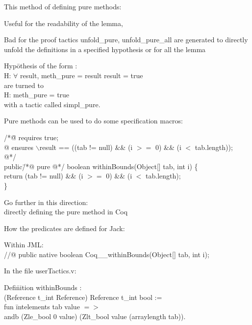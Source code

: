 \small
This method of defining pure methods:
\blist
\item Useful for the {\purple readability} of the lemma,
\item Bad for the proof
\elist
\rarrow tactics {\purple unfold\_pure}, {\purple unfold\_pure\_all}  are generated to {\purple directly 
unfold} the definitions in a specified hypothesis or for all the lemma
\begin{tabbing}
Hyp\=othesis of the form :\\
\>H: $\forall$ result, meth\_pure = result \rarrow result = true\\
are turned to\\
\>H: meth\_pure = true\\
with a tactic called {\purple simpl\_pure}.
\end{tabbing}
\small
\blist
\item Pure methods can be used to do some specification macros:
\begin{tabbing}
 /*\=@ {\purple requires} true;\+\\
   @ {\purple ensures} $\backslash$result == ((tab != null) \&\& (i $>=$ 0) \&\& (i $<$ tab.length));\\
   @*/\-\\
 public\= /*@ {\purple pure} @*/ boolean withinBounds(Object[] tab, int i) \{\\
 	\>return (tab != null) \&\& (i $>=$ 0) \&\& (i $<$ tab.length);\\
 \}\\
 \end{tabbing}
\item Go {\purple further} in this direction:\\
directly defining the pure method in Coq 
\elist

\small
How the predicates are defined for Jack:
\blist
\item Within JML:\\
  //@ public {\purple native} boolean {\purple Coq\_\_}withinBounds(Object[] tab, int i);
\item In the file userTactics.v:
\begin{tabbing}
  {\purple Defi}\={\purple nition} withinBounds : \+\\
  (Reference \rarrow t\_int \rarrow Reference) \rarrow Reference \rarrow t\_int \rarrow bool := \\
	{\purple fun} \= intelements tab value {\purple $=>$} \\
	\>andb (Zle\_bool 0 value) (Zlt\_bool value (arraylength tab)).\\
\end{tabbing}
\elist

